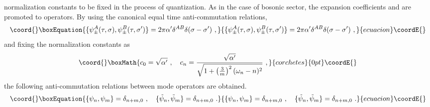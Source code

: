 \documentclass[a4paper,12pt]{article}
\begin{document}
normalization constants to be fixed in the process of quantization.
As in the case of bosonic sector, the expansion coefficients \coordHE{}
and \coordHE{} are promoted to operators.  By using the
canonical equal time anti-commutation relations,
\begin{equation}\coord{}\boxEquation{
\{ \psi^A_\pm (\tau, \sigma), \psi^B_\pm (\tau, \sigma') \}
= 2 \pi \alpha' \delta^{AB} \delta (\sigma - \sigma') ~,
\label{fcom}
}{
\{ \psi^A_\pm (\tau, \sigma), \psi^B_\pm (\tau, \sigma') \}
= 2 \pi \alpha' \delta^{AB} \delta (\sigma - \sigma') ~,
}{ecuacion}\coordE{}\end{equation}
and fixing the normalization constants as
\[\coord{}\boxMath{
c_0 = \sqrt{\alpha'}~,~~~
c_n = \frac{\sqrt{\alpha'}}{\sqrt{1 + 
          \left( \frac{3}{m} \right)^2 (\omega_n - n)^2 } }~,
}{corchetes}{0pt}\coordE{}\]
the following anti-commutation relations between mode operators are
obtained.
\begin{equation}\coord{}\boxEquation{
\{ \psi_n , \psi_m \} = \delta_{n+m,0} ~,~~~
\{ \tilde{\psi}_n, \tilde{\psi}_m \} = \delta_{n+m,0}~.
\label{fmcom}
}{
\{ \psi_n , \psi_m \} = \delta_{n+m,0} ~,~~~
\{ \tilde{\psi}_n, \tilde{\psi}_m \} = \delta_{n+m,0}~.
}{ecuacion}\coordE{}\end{equation}
\end{document}

